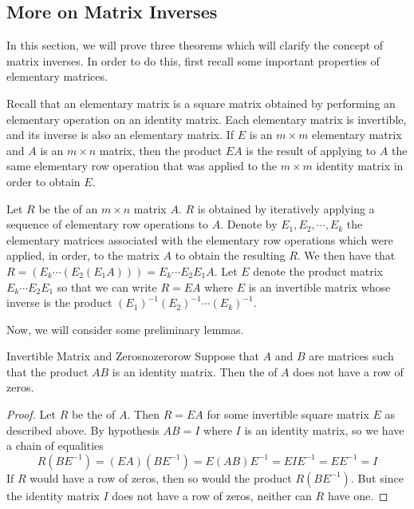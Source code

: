 \subsection{More on Matrix Inverses}

In this section, we will prove three theorems which will clarify the concept of matrix inverses. In order to do this, first recall some important properties of elementary matrices. 

Recall that an elementary matrix is a square matrix obtained by performing an elementary operation on an identity matrix. Each elementary matrix is invertible, and its inverse is also an elementary matrix. If $E$ is an $m \times m$ elementary matrix and $A$ is an $m \times n$ matrix, then the product $EA$ is the result of applying to $A$ the same elementary row operation that was applied to the $m \times m$ identity matrix in order to obtain $E$.

Let $R$ be the {\rref} of an $m \times n$ matrix $A$. $R$ is obtained by iteratively applying a sequence of elementary row operations to $A$. Denote by $E_1, E_2, \cdots, E_k$ the elementary matrices associated with the elementary row operations which were applied, in order, to the matrix $A$ to obtain the resulting $R$. We then have that $R = \left( E_k \cdots \left( E_2 \left( E_1A \right) \right)\right) = E_k \cdots E_2E_1A$. Let $E$ denote the product matrix $E_k \cdots E_2E_1$ so that we can write $R=EA$ where $E$ is an invertible matrix whose inverse is the product $(E_1)^{-1}(E_2)^{-1} \cdots (E_k)^{-1}$.

Now, we will consider some preliminary lemmas. 

\begin{lemma}{Invertible Matrix and Zeros}{nozerorow}
Suppose that $A$ and $B$ are matrices such that the product $AB$ is an identity matrix. Then the {\rref} of $A$ does not have a row of zeros.
\end{lemma}

\begin{proof}
Let $R$ be the {\rref} of $A$. Then $R=EA$ for some invertible square matrix $E$ as described above. By hypothesis $AB=I$ where $I$ is an identity matrix, so we have a chain of equalities
\begin{equation*}
R(BE^{-1})
=
(EA)(BE^{-1})
=
E(AB)E^{-1}
=
EIE^{-1}
=
EE^{-1}
=
I
\end{equation*}
If $R$ would have a row of zeros, then so would the product $R(BE^{-1})$. But since the identity matrix $I$ does not have a row of zeros, neither can $R$ have one.
\end{proof}

